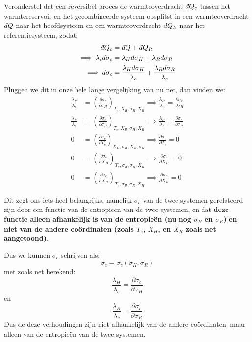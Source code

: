\begin{derivation}
Veronderstel dat een reversibel proces de warmteoverdracht \(\dbar Q_c\) tussen het warmtereservoir en het gecombineerde systeem opsplitst in een warmteoverdracht \(\dbar Q\)
naar het hoofdsysteem en een warmteoverdracht \(\dbar Q_R\) naar het referentiesysteem, zodat:
\begin{align*}
    \dbar Q_c &= \dbar Q + \dbar Q_R\\
    \implies \lambda_c d\sigma_c &= \lambda_H d\sigma_H + \lambda_R d\sigma_R\\
    \implies d\sigma_c &= \frac{\lambda_H d\sigma_H}{\lambda_c} + \frac{\lambda_R d\sigma_R}{\lambda_c}
\end{align*}
Pluggen we dit in onze hele lange vergelijking van nu net, dan vinden we:
\begin{align*}
    \frac{\lambda_H}{\lambda_c} &= \left(\frac{\partial \sigma_c}{\partial \sigma_H}\right)_{T_e, X_H, \sigma_R , X_R}
    \implies \frac{\lambda_H}{\lambda_c} = \frac{\partial \sigma_c}{\partial \sigma_H} \\
    \frac{\lambda_R}{\lambda_c} &= \left(\frac{\partial \sigma_c}{\partial \sigma_R}\right)_{ T_e, X_H, \sigma_H, X_R}
    \implies \frac{\lambda_R}{\lambda_c} = \frac{\partial \sigma_c}{\partial \sigma_R} \\
    0 &= \left(\frac{\partial \sigma_c}{\partial T_e}\right)_{X_H, \sigma_H, X_R, \sigma_R}
    \implies \frac{\partial \sigma_c}{\partial T_e} = 0 \\
    0 &= \left( \frac{\partial \sigma_c}{\partial X_H} \right)_{T_e, \sigma_H, \sigma_R, X_R}
    \implies \frac{\partial \sigma_c}{\partial X_H} = 0 \\
    0 &= \left(\frac{\partial \sigma_c}{\partial X_R} \right)_{T_e, \sigma_H, \sigma_R, X_H}
    \implies \frac{\partial \sigma_c}{\partial X_R} = 0
\end{align*}

Dit zegt ons iets heel belangrijks, namelijk \(\sigma_c\) van de twee systemen gerelateerd zijn door een functie van de entropieën van de twee systemen, en dat \textbf{deze functie alleen afhankelijk is van de entropieën (nu nog \(\sigma_H\) en \(\sigma_R\)) en niet van de andere coördinaten (zoals \(T_e\), \(X_H\), en \(X_R\) zoals net aangetoond).}

Dus we kunnen \(\sigma_c\) schrijven als:
\[\sigma_c = \sigma_c(\sigma_H, \sigma_R)\]
met zoals net berekend:
\[\frac{\lambda_H}{\lambda_c} = \frac{\partial \sigma_c}{\partial \sigma_H}\] en \[\frac{\lambda_R}{\lambda_c} = \frac{\partial \sigma_c}{\partial \sigma_R}\]
Dus de deze verhoudingen zijn niet afhankelijk van de andere coördinaten, maar alleen van de entropieën van de twee systemen.


\end{derivation}
